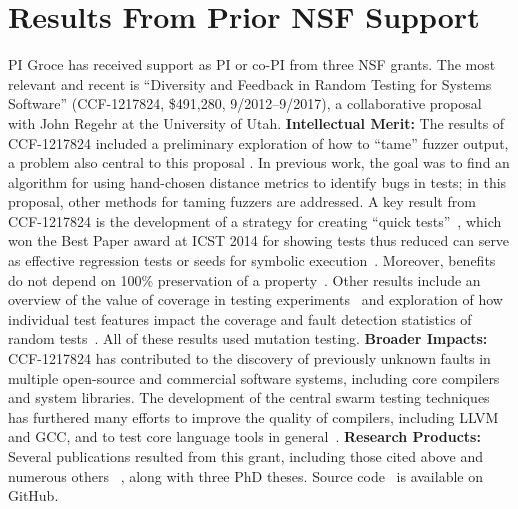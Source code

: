 \section{Results From Prior NSF Support}

PI Groce has received support as PI or co-PI from three NSF grants.
The most relevant and recent is ``Diversity and Feedback in Random
Testing for Systems Software'' (CCF-1217824,
\$491,280, 9/2012--9/2017), a collaborative proposal with John Regehr at the
University of Utah.
{\bf Intellectual Merit:} 
The results of CCF-1217824 included a preliminary exploration of how to
``tame'' fuzzer output, a problem also central to this proposal
\cite{PLDI13}.  In previous work, the goal was to find an algorithm
for using hand-chosen distance metrics to identify bugs in tests; in
this proposal, other methods for taming fuzzers are addressed.
A key result from CCF-1217824
is the development of a strategy for creating ``quick tests''~\cite{icst2014}, which won the
Best Paper award at ICST 2014 for showing tests thus
reduced can serve as effective regression tests or seeds for
symbolic execution~\cite{stvrcausereduce, issta14}.  Moreover, benefits do not depend on 100\%
preservation of a property~\cite{AlipourETAL16TestReduction}.   Other results include an overview of the value of coverage in
testing experiments~\cite{Onward14} and exploration of how individual
test features impact the coverage and fault detection statistics of
random tests~\cite{helphelp}.  
All of these results used
mutation testing.  {\bf Broader Impacts:} CCF-1217824 has contributed to the discovery of previously
unknown faults in multiple open-source and commercial software
systems, including core compilers and system libraries.  The
development of the central swarm testing techniques
has furthered many efforts to improve
the quality of compilers, including LLVM and GCC, and to test core language
tools in
general~\cite{ZhendongPLDI14,beginnerluck,dewey2015fuzzing,le2015randomized}. {\bf
  Research
Products:} Several publications resulted from this grant, including
those cited above and numerous others ~\cite{Onward14,PLDI13,issta14,icst2014,helphelp,DirectedSwarm,stvrcausereduce,tstlsttt,ISSTA15,AlipourETAL16TestReduction,tstlsttt,NFM15},
along with three PhD theses.  Source code~\cite{swarmtools,TSTL}  is
available on GitHub.